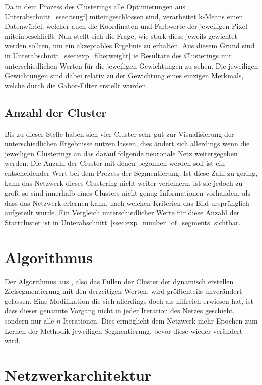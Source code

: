 Da in dem Prozess des Clusterings alle Optimierungen aus Unterabschnitt~\ref{ssec:tsugf} miteingeschlossen sind, verarbeitet k-Means einen Datenwürfel, welcher auch die Koordinaten und Farbwerte der jeweiligen Pixel miteinbeschließt. Nun stellt sich die Frage, wie stark diese jeweils gewichtet werden sollten, um ein akzeptables Ergebnis zu erhalten. Aus diesem Grund sind in Unterabschnitt~\ref{ssec:exp_filterweight} ie Resultate des Clusterings mit unterschiedlichen Werten für die jeweiligen Gewichtungen zu sehen. Die jeweiligen Gewichtungen sind dabei relativ zu der Gewichtung eines einzigen Merkmals, welche durch die Gabor-Filter erstellt wurden.

\subsection{Anzahl der Cluster}
\label{ssec:initialization_number_of_segments}

Bis zu dieser Stelle haben sich vier Cluster sehr gut zur Visualisierung der unterschiedlichen Ergebnisse nutzen lassen, dies ändert sich allerdings wenn die jeweiligen Clusterings an das darauf folgende neuronale Netz weitergegeben werden. Die Anzahl der Cluster mit denen begonnen werden soll ist ein entscheidender Wert bei dem Prozess der Segmentierung: Ist diese Zahl zu gering, kann das Netzwerk dieses Clustering nicht weiter verfeinern, ist sie jedoch zu groß, so sind innerhalb eines Clusters nicht genug Informationen vorhanden, als dass das Netzwerk erlernen kann, nach welchen Kriterien das Bild ursprünglich aufgeteilt wurde. Ein Vergleich unterschiedlicher Werte für diese Anzahl der Startcluster ist in Unterabschnitt~\ref{ssec:exp_number_of_segments} sichtbar.

\section{Algorithmus}
\label{sec:algorithm}

Der Algorithmus aus \cite{kanezaki_18}, also das Füllen der Cluster der dynamisch erstellen Zielsegmentierung mit den derzeitigen Werten, wird größtenteils unverändert gelassen. Eine Modifikation die sich allerdings doch als hilfreich erwiesen hat, ist dass dieser genannte Vorgang nicht in jeder Iteration des Netzes geschieht, sondern nur alle $n$ Iterationen. Dies ermöglicht dem Netzwerk mehr Epochen zum Lernen der Methodik jeweiligen Segmentierung, bevor diese wieder verändert wird.

\section{Netzwerkarchitektur}
\label{sec:network_architecture}

